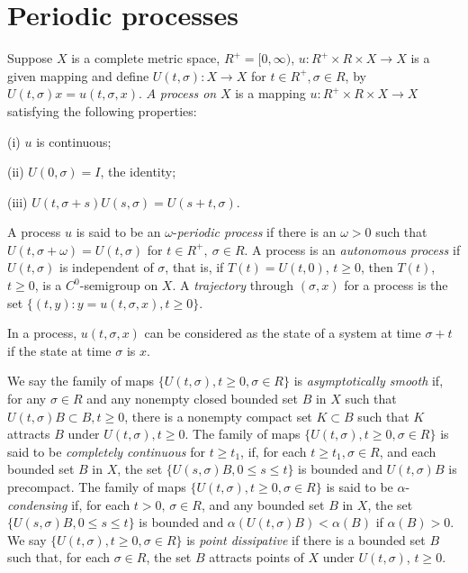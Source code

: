 \documentclass{surv-l}
\theoremstyle{plain}
\theoremstyle{definition}
\numberwithin{equation}{section}
\numberwithin{figure}{chapter}
\begin{document}
\section{Periodic processes}\label{sec3.6}

Suppose $X$ is a complete metric space, $R^{+}=[0,\infty)$, $u\!:R^{+}\times R\times X\rightarrow X$ is a given mapping and define $U(t,\sigma)\!:X\rightarrow X$ for $t\in R^{+},\sigma\in R$, by $U(t,\sigma)x= u(t,\sigma,x)$. $A$ \emph{process on} $X$ is a mapping $u\!:R^{+}\times R\times X\rightarrow X$ satisfying the following properties:

(i) $u$ is continuous;

(ii) $U(0,\sigma)=I$, the identity;

(iii) $U(t,\sigma+s)U(s,\sigma)=U(s+t,\sigma)$.

\noindent A process $u$ is said to be an $\omega$-\emph{periodic process} if there is an $\omega >0$ such that $U(t, \sigma+\omega)=U(t, \sigma)$ for $t\in R^{+},\ \sigma\in R$. A process is an \emph{autonomous process} if $U(t, \sigma)$ is independent of $\sigma$, that is, if $T(t)=U(t, 0)$, $t\geq 0$, then $T(t)$, $t\geq 0$, is a $C^{0}$-semigroup on $X$. A \emph{trajectory} through $(\sigma, x)$ for a process is the set $\{(t,y)\!:y=u(t,\sigma,x),t\geq 0\}$.

In a process, $u(t, \sigma, x)$ can be considered as the state of a system at time $\sigma+t$ if the state at time $\sigma$ is $x$.

We say the family of maps $\{U(t,\sigma),t\geq 0,\sigma\in R\}$ is \emph{asymptotically smooth} if, for any $\sigma\in R$ and any nonempty closed bounded set $B$ in $X$ such that $U(t,\sigma)B\subset B, t\geq 0$, there is a nonempty compact set $K\subset B$ such that $K$ attracts $B$ under $U(t,\sigma), t\geq 0$. The family of maps $\{U(t,\sigma),t\geq 0, \sigma\in R\}$ is said to be \emph{completely continuous} for $t\geq t_{1}$, if, for each $t\geq t_{1},\sigma\in R$, and each bounded set $B$ in $X$, the set $\{U(s,\sigma)B, 0\leq s\leq t\}$ is bounded and $U(t,\sigma)B$ is precompact. The family of maps $\{U(t,\sigma), t\geq 0,\sigma\in R\}$ is said to be $\alpha$-\emph{condensing} if, for each $t>0,\,\sigma\in R$, and any bounded set $B$ in $X$, the set $\{U(s,\sigma)B,0\leq s\leq t\}$ is bounded and $\alpha(U(t,\sigma)B)<\alpha(B)$ if $\alpha(B)>0$. We say $\{U(t,\sigma),t\geq 0, \sigma\in R\}$ is \emph{point dissipative} if there is a bounded set $B$ such that, for each $\sigma\in R$, the set $B$ attracts points of $X$ under $U(t,\sigma)$, $t\geq 0$.
\end{document}
